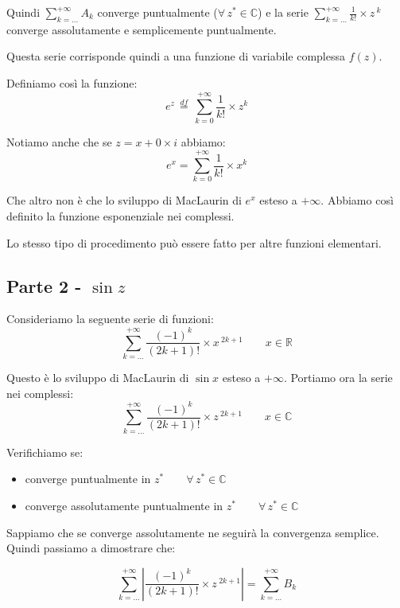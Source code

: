\documentclass[../dimostrazioni]{subfiles}
\begin{document}
                Quindi \(\sum_{k=\dots}^{+\infty} A_k\) converge puntualmente (\(\forall \, z^* \in \mathbb{C}\)) 
                e la serie  \(\sum_{k=\dots}^{+\infty} \frac{1}{k!} \times z\,^k \) converge assolutamente e semplicemente puntualmente.

                Questa serie corrisponde quindi a una funzione di variabile complessa \(f(z)\).

                Definiamo così la funzione:
                \[  e^z \, \stackrel{df}{=} \, \sum_{k=0}^{+\infty} \frac{1}{k!} \times z^k    \]

                Notiamo anche che se \(z = x + 0 \times i\) abbiamo:
                \[  e^x = \sum_{k=0}^{+\infty} \frac{1}{k!} \times x^k \]

                Che altro non è che lo sviluppo di MacLaurin di \(e^x\) esteso a \(+\infty\). 
                Abbiamo così definito la funzione esponenziale nei complessi.

            Lo stesso tipo di procedimento può essere fatto per altre funzioni elementari.
            
            \subsection*{Parte 2 - \(\sin z\)}

                Consideriamo la seguente serie di funzioni:
                \[  \sum_{k=\dots}^{+\infty} \frac{(-1)^k}{(2k+1)!} \times x\,^{2k+1} \qquad x \in \mathbb{R}  \]

                Questo è lo sviluppo di MacLaurin di \(\sin x\) esteso a \(+ \infty\). Portiamo ora la serie nei complessi:
                \[  \sum_{k=\dots}^{+\infty} \frac{(-1)^k}{(2k+1)!} \times z\,^{2k+1} \qquad x \in \mathbb{C}  \]

                Verifichiamo se:
                \begin{itemize}
                    \item converge puntualmente in \(z^* \qquad \forall \, z^*  \in \mathbb{C}\)
                    \item converge assolutamente puntualmente in \(z^* \qquad \forall \, z^*  \in \mathbb{C}\)
                \end{itemize}
            
                Sappiamo che se converge assolutamente ne seguirà la convergenza semplice. Quindi passiamo a dimostrare che:

                \[  \sum_{k=\dots}^{+\infty} \left| \frac{(-1)^k}{(2k+1)!} \times z\,^{2k+1} \right| = \sum_{k=\dots}^{+\infty} B_k \]
\end{document}
